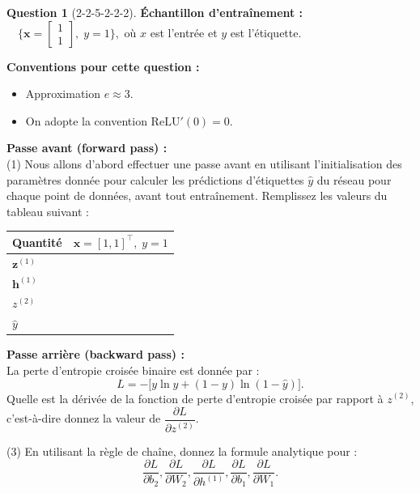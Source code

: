 \documentclass[12pt]{article}
\theoremstyle{definition}
\newtheorem{exercise}{Question}%
\newcommand{\pd}[2]{\dfrac{\partial #1}{\partial #2}}
\newcommand{\relu}{\mathrm{ReLU}}
\newcommand{\vect}[1]{\bm{#1}}
\begin{document}
\begin{exercise}[2-2-5-2-2-2]
{\noindent \textbf{Échantillon d'entraînement :}
$ \quad \biggl\{
\vect{x} = \begin{bmatrix} 1 \\ 1 \end{bmatrix},\; y = 1
\biggr\},
$
où $x$ est l'entrée et $y$ est l'étiquette.

\noindent \textbf{Conventions pour cette question :}
\begin{itemize}[nosep]
    \item Approximation $e \approx 3$.
    \item On adopte la convention $\relu'(0) = 0$.
\end{itemize}

\textbf{Passe avant (forward pass) :} \\
\noindent (1) Nous allons d'abord effectuer une passe avant en utilisant l'initialisation des paramètres donnée pour calculer les prédictions d'étiquettes $\hat{y}$ du réseau pour chaque point de données, avant tout entraînement. Remplissez les valeurs du tableau suivant :
\begin{center}
\renewcommand{\arraystretch}{1.4}
\begin{tabular}{l|c}
    \toprule
    \textbf{Quantité} & $\vect{x} = [1,1]^\top,\; y = 1$ \\
    \midrule
    $\vect{z}^{(1)}$ &   \\
    $\vect{h}^{(1)}$ &   \\
    $z^{(2)}$        &   \\
    $\hat{y}$        &   \\
    \bottomrule
\end{tabular}
\end{center}

\textbf{Passe arrière (backward pass) :} \\
La perte d'entropie croisée binaire est donnée par :
\begin{equation*}
    L = -\Big[ y \ln \hat{y} + (1 - y) \ln(1 - \hat{y}) \Big].
    \label{eq:bce}
\end{equation*}
Quelle est la dérivée de la fonction de perte d'entropie croisée par rapport à $z^{(2)}$, c'est-à-dire donnez la valeur de $\pd{L}{z^{(2)}}$.

\noindent (3) En utilisant la règle de chaîne, donnez la formule analytique pour :
\begin{equation*}
    \pd{L}{b_2}, \pd{L}{W_2}, \pd{L}{h^{(1)}}, \pd{L}{b_1}, \pd{L}{W_1}. 
\end{equation*}

}
\end{exercise}
\end{document}
